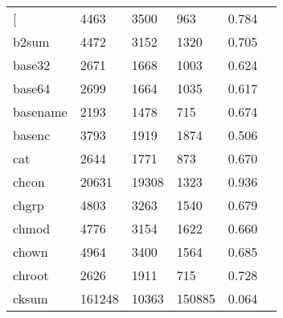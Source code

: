 \begin{longtable}{lp{2.4cm}p{2.4cm}p{2.4cm}p{2.4cm}p{2.4cm}}
\bottomrule
\endlastfoot
{[}         &                                    4463 &                        3500 &                          963 &                                   0.784 \\
b2sum     &                                    4472 &                        3152 &                         1320 &                                   0.705 \\
base32    &                                    2671 &                        1668 &                         1003 &                                   0.624 \\
base64    &                                    2699 &                        1664 &                         1035 &                                   0.617 \\
basename  &                                    2193 &                        1478 &                          715 &                                   0.674 \\
basenc    &                                    3793 &                        1919 &                         1874 &                                   0.506 \\
cat       &                                    2644 &                        1771 &                          873 &                                   0.670 \\
chcon     &                                   20631 &                       19308 &                         1323 &                                   0.936 \\
chgrp     &                                    4803 &                        3263 &                         1540 &                                   0.679 \\
chmod     &                                    4776 &                        3154 &                         1622 &                                   0.660 \\
chown     &                                    4964 &                        3400 &                         1564 &                                   0.685 \\
chroot    &                                    2626 &                        1911 &                          715 &                                   0.728 \\
cksum     &                                  161248 &                       10363 &                       150885 &                                   0.064 \\

\end{longtable}

